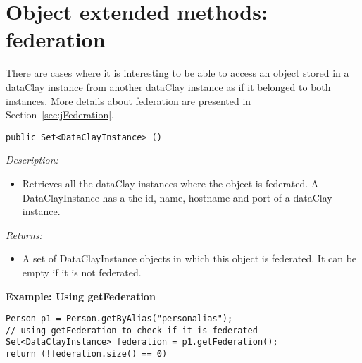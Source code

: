 \section{Object extended methods: federation}
\label{sec:JavaObjectFederation}

There are cases where it is interesting to be able to access an object stored in a dataClay instance from another dataClay instance as if it belonged to both instances. More details about federation are presented in Section~\ref{sec:jFederation}.


\begin{dBox}
\texttt{public Set<DataClayInstance> ()}
\LINE

{\it Description:}

\begin{itemize}
 \item Retrieves all the dataClay instances where the object is federated. 
 A DataClayInstance has a the id, name, hostname and port of a dataClay instance.
\end{itemize}

{\it Returns:}

\begin{itemize}
 \item A set of DataClayInstance objects in which this object is federated. 
 It can be empty if it is not federated.
\end{itemize}

\end{dBox}

\begin{tBox}
\textcolor{basecolor} {\bf Example: Using getFederation}
\begin{lstlisting}
Person p1 = Person.getByAlias("personalias");
// using getFederation to check if it is federated
Set<DataClayInstance> federation = p1.getFederation();
return (!federation.size() == 0)
\end{lstlisting}
\end{tBox}

